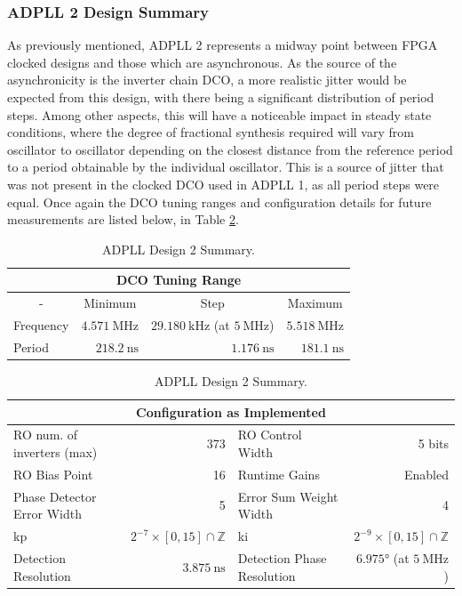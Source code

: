 \subsubsection{\acs{ADPLL} 2 Design Summary}
As previously mentioned, \ac{ADPLL} 2 represents a midway point between \ac{FPGA} clocked designs and those which are asynchronous. As the source of the asynchronicity is the inverter chain \ac{DCO}, a more realistic jitter would be expected from this design, with there being a significant distribution of period steps. Among other aspects, this will have a noticeable impact in steady state conditions, where the degree of fractional synthesis required will vary from oscillator to oscillator depending on the closest distance from the reference period to a period obtainable by the individual oscillator. This is a source of jitter that was not present in the clocked \ac{DCO} used in \ac{ADPLL} 1, as all period steps were equal. Once again the \ac{DCO} tuning ranges and configuration details for future measurements are listed below, in Table \ref{table:adpll2}.

\begin{table}[!h]%
	\begin{center}
		\begin{tabular}{|l|r|r|r|}
			\multicolumn{4}{c}{\ac{DCO} Tuning Range} \T\\
			\hline
			\multicolumn{1}{|c|}{-} & \multicolumn{1}{c|}{Minimum} & \multicolumn{1}{c|}{Step} & \multicolumn{1}{c|}{Maximum} \T\\
			\hline
			Frequency & $4.571~\si{\mega\hertz}$ & $29.180~\si{\kilo\hertz}$ (at $5~\si{\mega\hertz}$) & $5.518~\si{\mega\hertz}$ \T\\
			\hline
			Period & $218.2~\si{\nano\second}$ & $1.176~\si{\nano\second}$ & $181.1~\si{\nano\second}$ \T\\
			\hline
		\end{tabular}
		\begin{tabular}{|l|r|l|r|}
			\multicolumn{4}{c}{Configuration as Implemented} \T\\
			\hline
			\ac{RO} num. of inverters (max) & 373 & \ac{RO} Control Width & 5 bits \T\\
			\hline
			\ac{RO} Bias Point & 16 & Runtime Gains & Enabled \T\\
			\hline
			Phase Detector Error Width & 5 & Error Sum Weight Width & 4 \T\\
			\hline
			\acs{kp} & $2^{-7}\times[0,15]\cap\mathbb{Z}$ & \acs{ki} & $2^{-9}\times[0,15]\cap\mathbb{Z}$ \T\\
			\hline
			Detection Resolution & $3.875~\si{\nano\second}$ & Detection Phase Resolution & $6.975\si{\degree}$ (at $5~\si{\mega\hertz}$)\\
			\hline
		\end{tabular}
	\end{center}
	\caption[ADPLL Design 2 Summary]{ADPLL Design 2 Summary.}
	\label{table:adpll2}
\end{table}


